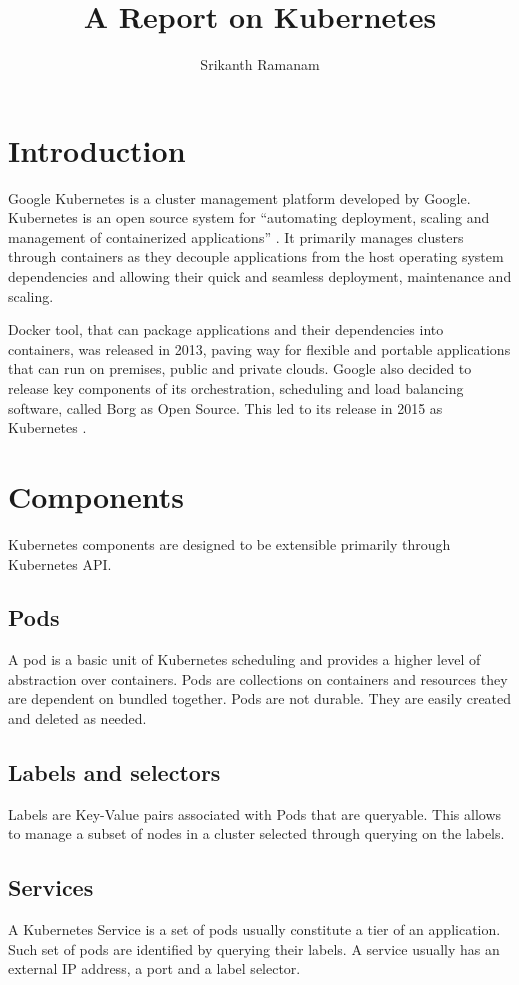 \documentclass[9pt,twocolumn,twoside]{../../styles/osajnl}
\title{A Report on Kubernetes}
\author[1]{Srikanth Ramanam}
\affil[1]{School of Informatics and Computing, Bloomington, IN 47408, U.S.A.}
\affil[*]{Corresponding authors: srikrama@iu.edu}
\begin{document}
\maketitle

\section{Introduction}
Google Kubernetes is a cluster management platform developed by Google. Kubernetes is an open source system for “automating deployment, scaling and management of containerized applications” \cite{www-kubernetesdoc}. It primarily manages clusters through containers as they decouple applications from the host operating system dependencies and allowing their quick and seamless deployment, maintenance and scaling.


 Docker tool, that can package applications and their dependencies into containers, was released in 2013, paving way for flexible and portable applications that can run on premises, public and private clouds. Google also decided to release key components of its orchestration, scheduling and load balancing software, called Borg as Open Source. This led to its release in 2015 as Kubernetes \cite{www-kubernetesebook}.



\section{Components}
Kubernetes components are designed to be extensible primarily through Kubernetes API. 
\subsection{Pods}
A pod is a basic unit of Kubernetes scheduling and provides a higher level of abstraction over containers. Pods are collections on containers and resources they are dependent on bundled together. Pods are not durable. They are easily created and deleted as needed.
\subsection{Labels and selectors}
Labels are Key-Value pairs associated with Pods that are queryable. This allows to manage a subset of nodes in a cluster selected through querying on the labels.

\subsection{Services}
A Kubernetes Service is a set of pods usually constitute a tier of an application. Such set of pods are identified by querying their labels. A service usually has an external IP address, a port and a label selector.
\end{document}
